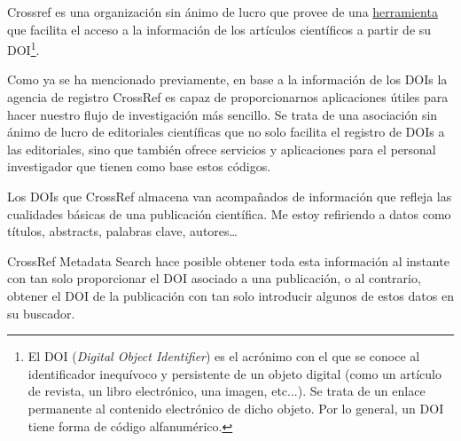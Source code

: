  Crossref es una organización sin ánimo de lucro que provee de una \href{https://www.crossref.org/}{herramienta} que facilita el acceso a la información de los artículos científicos a partir de su DOI\footnote{El DOI (\textit{Digital Object Identifier}) es el acrónimo con el que se conoce al identificador inequívoco y persistente de un objeto digital (como un artículo de revista, un libro electrónico, una imagen, etc...). Se trata de un enlace permanente al contenido electrónico de dicho objeto. Por lo general, un DOI tiene forma de código alfanumérico.}.

Como ya se ha mencionado previamente, en base a la información de los DOIs la agencia de registro CrossRef es capaz de proporcionarnos aplicaciones útiles para hacer nuestro flujo de investigación más sencillo.
Se trata de una asociación sin ánimo de lucro de editoriales científicas que no solo facilita el registro de DOIs a las editoriales, sino que también ofrece servicios y aplicaciones para el personal investigador que tienen como base estos códigos.

Los DOIs que CrossRef almacena van acompañados de información que refleja las cualidades básicas de una publicación científica. Me estoy refiriendo a datos como títulos, abstracts, palabras clave, autores…

CrossRef Metadata Search hace posible obtener toda esta información al instante con tan solo proporcionar el DOI asociado a una publicación, o al contrario, obtener el DOI de la publicación con tan solo introducir algunos de estos datos en su buscador.









